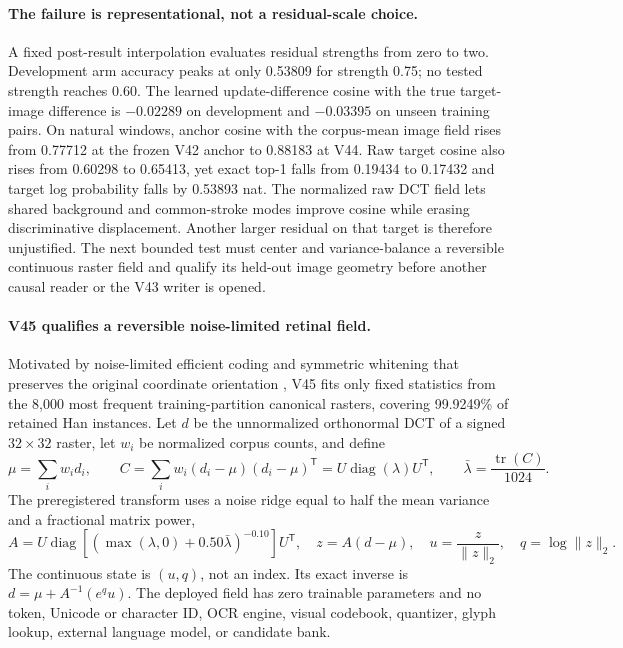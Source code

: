 \documentclass[11pt]{article}
\begin{document}
\paragraph{The failure is representational, not a residual-scale choice.}
A fixed post-result interpolation evaluates residual strengths from zero to
two. Development arm accuracy peaks at only 0.53809 for strength 0.75; no tested
strength reaches 0.60. The learned update-difference cosine with the true
target-image difference is $-0.02289$ on development and $-0.03395$ on unseen
training pairs. On natural windows, anchor cosine with the corpus-mean image
field rises from 0.77712 at the frozen V42 anchor to 0.88183 at V44. Raw target
cosine also rises from 0.60298 to 0.65413, yet exact top-1 falls from 0.19434 to
0.17432 and target log probability falls by 0.53893 nat. The normalized raw DCT
field lets shared background and common-stroke modes improve cosine while
erasing discriminative displacement. Another larger residual on that target is
therefore unjustified. The next bounded test must center and variance-balance a
reversible continuous raster field and qualify its held-out image geometry
before another causal reader or the V43 writer is opened.

\paragraph{V45 qualifies a reversible noise-limited retinal field.}
Motivated by noise-limited efficient coding \cite{atickredlich} and symmetric
whitening that preserves the original coordinate orientation
\cite{kessywhitening}, V45 fits only fixed statistics from the 8,000 most frequent training-partition
canonical rasters, covering 99.9249\% of retained Han instances. Let $d$ be the
unnormalized orthonormal DCT of a signed $32\times32$ raster, let $w_i$ be
normalized corpus counts, and define
\[
\mu=\sum_i w_i d_i,\qquad
C=\sum_iw_i(d_i-\mu)(d_i-\mu)^\mathsf{T}
=U\operatorname{diag}(\lambda)U^\mathsf{T},\qquad
\bar\lambda=\frac{\operatorname{tr}(C)}{1024}.
\]
The preregistered transform uses a noise ridge equal to half the mean variance
and a fractional matrix power,
\[
A=U\operatorname{diag}\!\left[
  (\max(\lambda,0)+0.50\bar\lambda)^{-0.10}
\right]U^\mathsf{T},\quad
z=A(d-\mu),\quad u=\frac{z}{\lVert z\rVert_2},\quad
q=\log\lVert z\rVert_2.
\]
The continuous state is $(u,q)$, not an index. Its exact inverse is
$d=\mu+A^{-1}(e^q u)$. The deployed field has zero trainable parameters and no
token, Unicode or character ID, OCR engine, visual codebook, quantizer, glyph
lookup, external language model, or candidate bank.
\end{document}
